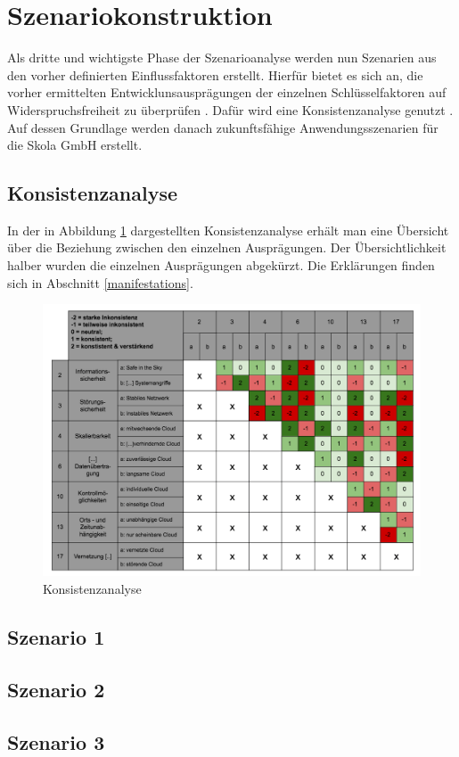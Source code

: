 \section{Szenariokonstruktion}
\label{constructions}
Als dritte und wichtigste Phase der Szenarioanalyse werden nun Szenarien aus den vorher definierten Einflussfaktoren erstellt. Hierfür bietet es sich an, die vorher ermittelten Entwicklunsausprägungen der einzelnen Schlüsselfaktoren auf Widerspruchsfreiheit zu überprüfen . Dafür wird eine Konsistenzanalyse genutzt \cite{spath}. Auf dessen Grundlage werden danach zukunftsfähige Anwendungsszenarien für die Skola GmbH erstellt.

\subsection{Konsistenzanalyse}

In der in Abbildung \ref{fig:konsistenzanalyse} dargestellten Konsistenzanalyse erhält man eine Übersicht über die Beziehung zwischen den einzelnen Ausprägungen. Der Übersichtlichkeit halber wurden die einzelnen Ausprägungen abgekürzt. Die Erklärungen finden sich in Abschnitt \ref{manifestations}.


\begin{figure}
	\centering
	\includegraphics[width=\linewidth]{images/konsistenzanalyse}
	\caption[Caption for parameters]{Konsistenzanalyse}
	\label{fig:konsistenzanalyse}
\end{figure}

\subsection{Szenario 1}
\subsection{Szenario 2}

\subsection{Szenario 3}

